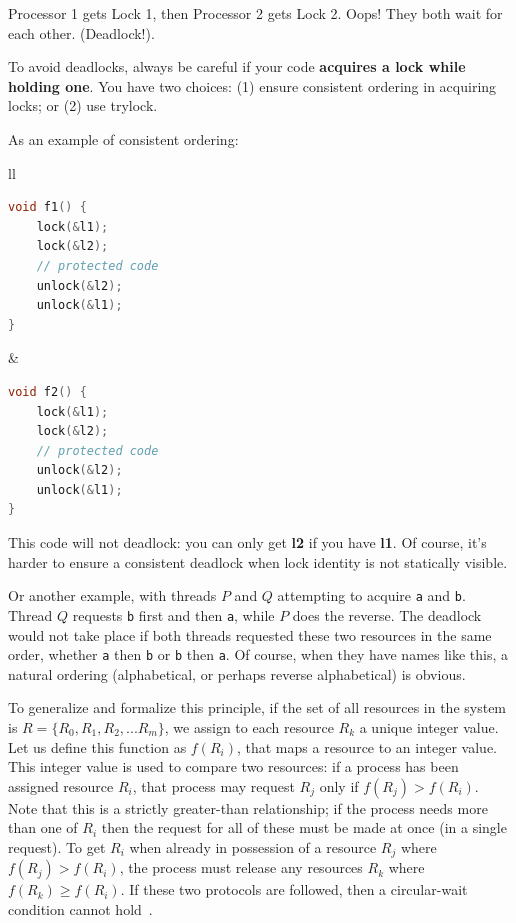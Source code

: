 \documentclass[a4paper]{report}
\begin{document}
 Processor 1 gets Lock 1, then Processor 2 gets Lock 2. Oops! They
 both wait for each other. (Deadlock!).

To avoid deadlocks, always be careful if your code {\bf acquires a
  lock while holding one}.  You have two choices: (1) ensure
consistent ordering in acquiring locks; or (2) use trylock.

As an example of consistent ordering:
\begin{center}
\begin{tabular}{ll}
\begin{minipage}{.4\textwidth}
  \begin{lstlisting}[language=C]
void f1() {
    lock(&l1);
    lock(&l2);
    // protected code
    unlock(&l2);
    unlock(&l1);    
}
\end{lstlisting}
\end{minipage}&
\begin{minipage}{.4\textwidth}
\begin{lstlisting}[language=C]
void f2() {
    lock(&l1);
    lock(&l2);
    // protected code
    unlock(&l2);
    unlock(&l1);    
}
  \end{lstlisting}
\end{minipage}
\end{tabular}
\end{center}
This code will not deadlock: you can only get {\bf l2} if you have
{\bf l1}. Of course, it's harder to ensure a consistent deadlock when lock
identity is not statically visible.

Or another example, with threads $P$ and $Q$ attempting to acquire \texttt{a} and \texttt{b}. Thread $Q$ requests \texttt{b} first and then \texttt{a}, while $P$ does the reverse. The deadlock would not take place if both threads requested these two resources in the same order, whether \texttt{a} then \texttt{b} or \texttt{b} then \texttt{a}. Of course, when they have names like this, a natural ordering (alphabetical, or perhaps reverse alphabetical) is obvious. 

To generalize and formalize this principle, if the set of all resources in the system is $R = \{R_{0}, R_{1}, R_{2}, ... R_{m}\}$, we assign to each resource $R_{k}$ a unique integer value. Let us define this function as $f(R_{i})$, that maps a resource to an integer value. This integer value is used to compare two resources: if a process has been assigned resource $R_{i}$, that process may request $R_{j}$ only if $f(R_{j}) > f(R_{i})$. Note that this is a strictly greater-than relationship; if the process needs more than one of $R_{i}$ then the request for all of these must be made at once (in a single request). To get $R_{i}$ when already in possession of a resource $R_{j}$ where $f(R_{j}) > f(R_{i})$, the process must release any resources $R_{k}$ where $f(R_{k}) \geq f(R_{i})$. If these two protocols are followed, then a circular-wait condition cannot hold~\cite{osc}.
\end{document}
